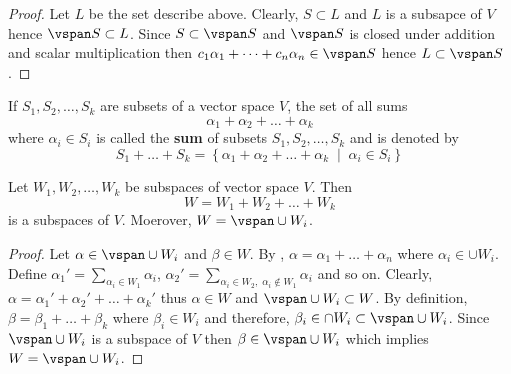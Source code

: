 \begin{proof}
    Let \(L\) be the set describe above. Clearly, \(S \subset L\) and \(L\) is a subsapce of \(V\) hence \(\vspan S \subset L\). Since \(S \subset \vspan S\) and \(\vspan S\) is closed under addition and scalar multiplication then \( c_1 \alpha_1 + \dots + c_n \alpha_n \in \vspan S\) hence \(L \subset \vspan S\).
\end{proof}

\begin{definition}
    If \(S_1, S_2, \dots , S_k\) are subsets of a vector space \(V\), the set of all sums
    \begin{equation*}
        \alpha_1 + \alpha_2 + \dots + \alpha_k
    \end{equation*}
    where \(\alpha_i \in S_i\) is called the \textbf{sum} of subsets \(S_1, S_2, \dots , S_k\) and is denoted by
    \begin{equation*}
        S_1 + \dots + S_k = \left \{\alpha_1 + \alpha_2 + \dots + \alpha_k \; \middle | \; \alpha_i \in S_i \right \}
    \end{equation*}
\end{definition}

\begin{theorem}
    Let \(W_1, W_2, \dots , W_k\) be subspaces of vector space \(V\). Then
    \begin{equation*}
        W = W_1 + W_2 + \dots + W_k
    \end{equation*}
    is a subspaces of \(V\). Moerover, \( W = \vspan \cup W_i \).
\end{theorem}

\begin{proof}
    Let \(\alpha \in \vspan \cup W_i\) and \(\beta \in W\). By , \(\alpha = \alpha_1 + \dots + \alpha_n\) where \(\alpha_i \in \cup W_i\). Define \(\alpha_1 ' = \sum _{\alpha_i \in W_1} \alpha_i\), \(\alpha_2' = \sum_{\alpha_i \in W_2, \; \alpha_i \notin W_1} \alpha_i\) and so on. Clearly, \(\alpha = \alpha_1' + \alpha_2' + \dots + \alpha_k'\) thus \(\alpha \in W\) and \(\vspan \cup W_i \subset W\).
    By definition, \(\beta = \beta_1 + \dots + \beta_k\) where \(\beta_i \in W_i\) and therefore, \(\beta_i \in \cap W_i \subset \vspan \cup W_i\). Since \(\vspan \cup W_i\) is a subspace of \(V\) then \(\beta \in \vspan \cup W_i\) which implies \(W = \vspan \cup W_i\).
\end{proof}

